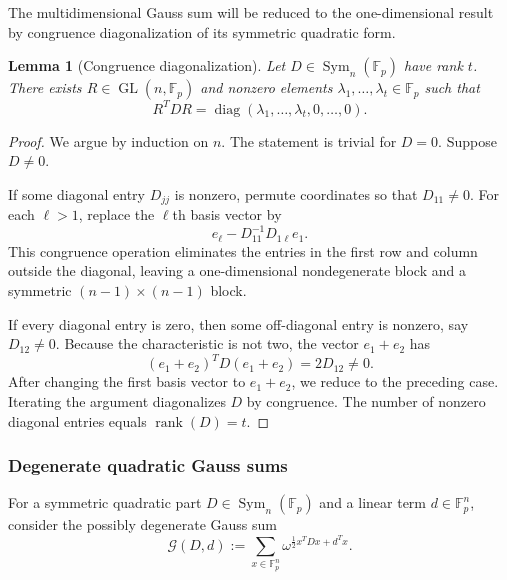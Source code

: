 \documentclass[11pt]{article}
\newcommand{\F}{\mathbb F}
\newcommand{\Sym}{\operatorname{Sym}}
\newcommand{\rank}{\operatorname{rank}}
\newcommand{\1}{\mathbf 1}
\theoremstyle{plain}
\newtheorem{lemma}[theorem]{Lemma}
\theoremstyle{definition}
\theoremstyle{remark}
\begin{document}
The multidimensional Gauss sum will be reduced to the one-dimensional result
by congruence diagonalization of its symmetric quadratic form.

\begin{lemma}[Congruence diagonalization]
\label{lem:appB-congruence-diagonalization}
Let $D\in\Sym_n(\F_p)$ have rank $t$.  There exists
$R\in\operatorname{GL}(n,\F_p)$ and nonzero elements
$\lambda_1,\ldots,\lambda_t\in\F_p$ such that
\begin{equation}
  R^TDR
  =\operatorname{diag}(\lambda_1,\ldots,\lambda_t,
                        0,\ldots,0).
  \label{eq:appB-congruence-diagonalization}
\end{equation}
\end{lemma}

\begin{proof}
We argue by induction on $n$.  The statement is trivial for $D=0$.  Suppose
$D\ne0$.

If some diagonal entry $D_{jj}$ is nonzero, permute coordinates so that
$D_{11}\ne0$.  For each $\ell>1$, replace the $\ell$th basis vector by
\begin{equation}
  e_\ell-D_{11}^{-1}D_{1\ell}e_1.
  \label{eq:appB-diagonal-elimination}
\end{equation}
This congruence operation eliminates the entries in the first row and column
outside the diagonal, leaving a one-dimensional nondegenerate block and a
symmetric $(n-1)\times(n-1)$ block.

If every diagonal entry is zero, then some off-diagonal entry is nonzero, say
$D_{12}\ne0$.  Because the characteristic is not two, the vector
$e_1+e_2$ has
\begin{equation}
  (e_1+e_2)^TD(e_1+e_2)=2D_{12}\ne0.
  \label{eq:appB-create-nonzero-diagonal}
\end{equation}
After changing the first basis vector to $e_1+e_2$, we reduce to the preceding
case.  Iterating the argument diagonalizes $D$ by congruence.  The number of
nonzero diagonal entries equals $\rank(D)=t$.
\end{proof}

\subsubsection{Degenerate quadratic Gauss sums}
\label{appsubsec:degenerate-quadratic-Gauss-sums}

For a symmetric quadratic part $D\in\Sym_n(\F_p)$ and a linear term
$d\in\F_p^n$, consider the possibly degenerate Gauss sum
\begin{equation}
  \mathcal G(D,d)
  :=\sum_{x\in\F_p^n}
    \omega^{\frac12x^TDx+d^Tx}.
  \label{eq:appB-general-Gauss-sum}
\end{equation}
\end{document}
